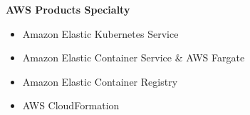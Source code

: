 \textbf{AWS Products Specialty}
\begin{itemize}
    \item Amazon Elastic Kubernetes Service
    \item Amazon Elastic Container Service \& AWS Fargate
    \item Amazon Elastic Container Registry
    \item AWS CloudFormation
    \\[1\baselineskip]
\end{itemize} 